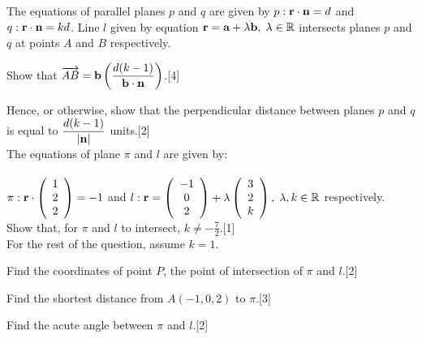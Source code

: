 \documentclass[12pt, a4 paper]{article}
\begin{document}
\begin{outline}[enumerate]
	\1 The equations of parallel planes $p$ and $q$ are given by $p:{\bf{r}} \cdot {\bf{n}} = d$ and $q:{\bf{r}} \cdot {\bf{n}} = kd$. Line $l$ given by equation ${\bf{r}} = {\bf{a}} + \lambda {\bf{b}},\;\lambda  \in \mathbb{R}$ intersects planes $p$ and $q$ at points $A$ and $B$ respectively.
		
	\2 Show that $\overrightarrow {AB}  = {\bf{b}}\left( {\dfrac{{d(k - 1)}}{{{\bf{b}} \cdot {\bf{n}}}}} \right)$.\hfill[4]
						
	\2 Hence, or otherwise, show that the perpendicular distance between planes $p$ and $q$ is equal to $\dfrac{{d(k - 1)}}{{\left| {\bf{n}} \right|}}$ units.\hfill[2]\\
		
	\1 The equations of plane $\pi $ and $l$ are given by:\\\\
	$\pi :{\bf{r}} \cdot \left( {\begin{array}{*{20}{c}}1\\2\\2\end{array}} \right) =  - 1$ and $l:{\bf{r}} = \left( {\begin{array}{*{20}{c}}{ - 1}\\0\\2\end{array}} \right) + \lambda \left( {\begin{array}{*{20}{c}}3\\2\\k\end{array}} \right),\;\lambda ,k \in \mathbb{R}$ respectively.\\
		
	\2 Show that, for $\pi $ and $l$ to intersect, $k \ne  - \frac{7}{2}$.\hfill[1]\\
	
	For the rest of the question, assume $k = 1$.
		
	\2 Find the coordinates of point $P$, the point of intersection of $\pi $ and $l$.\hfill[2]
						
	\2 Find the shortest distance from $A( - 1,0,2)$ to $\pi $.\hfill[3]
						
	\2 Find the acute angle between $\pi $ and $l$.\hfill[2]\\
			

\end{outline}
\end{document}
